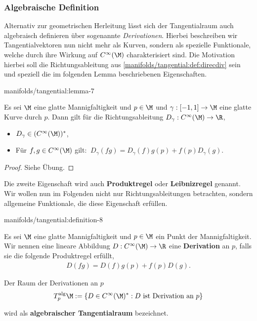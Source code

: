 \documentclass[letterpaper,10pt,german]{jupyterBook}
\begin{document}
\subsubsection{Algebraische Definition}
\label{\detokenize{manifolds/tangential:algebraische-definition}}
\par
Alternativ zur geometrischen Herleitung lässt sich der Tangentialraum auch algebraisch definieren über sogenannte \emph{Derivationen}.
Hierbei beschreiben wir Tangentialvektoren nun nicht mehr als Kurven, sondern als spezielle Funktionale, welche durch ihre Wirkung auf \(C^\infty(\M)\) charakterisiert sind.
Die Motivation hierbei soll die Richtungsableitung aus \cref{manifolds/tangential:def:direcdiv} sein und speziell die im folgenden Lemma beschriebenen Eigenschaften.
\begin{lemma}{}{manifolds/tangential:lemma-7}



\par
Es sei \(\M\) eine glatte Mannigfaltigkeit und \(p\in\M\) und \(\gamma:[-1,1]\to\M\) eine glatte Kurve durch \(p\).
Dann gilt für die Richtungsableitung \(D_\gamma:C^\infty(\M)\to\R\),
\begin{itemize}
\item {} 
\par
\(D_\gamma\in (C^\infty(\M))^\ast\),

\item {} 
\par
Für \(f,g\in C^\infty(\M)\) gilt: \(\ D_\gamma(fg) = D_\gamma(f) g(p) + f(p) D_\gamma(g)\).

\end{itemize}
\end{lemma}

\begin{proof}
 Siehe Übung.
\end{proof}

\par
Die zweite Eigenschaft wird auch \textbf{Produktregel} oder \textbf{Leibnizregel} genannt.
Wir wollen nun im Folgenden nicht nur Richtungsableitungen betrachten, sondern allgemeine Funktionale, die diese Eigenschaft erfüllen.
\begin{definition}{}{manifolds/tangential:definition-8}



\par
Es sei \(\M\) eine glatte Mannigfaltigkeit und \(p\in\M\) ein Punkt der Mannigfaltigkeit.
Wir nennen eine lineare Abbildung \(D: C^\infty(\M) \to \R\) eine \textbf{Derivation} an \(p\), falls sie die folgende Produktregel erfüllt,
\begin{align*}
D(fg) = D(f) g(p) + f(p) D(g).
\end{align*}
\par
Der Raum der Derivationen an \(p\)
\begin{align*}
T^{\text{alg}}_p\M := \{D\in C^\infty(\M)^\ast: D\text{ ist Derivation an }p\}
\end{align*}
\par
wird als \textbf{algebraischer Tangentialraum} bezeichnet.
\end{definition}
\end{document}
